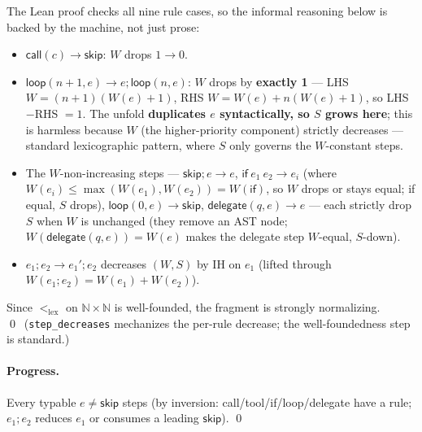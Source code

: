 \documentclass[11pt]{article}
\theoremstyle{plain}
\newcommand{\kw}[1]{\mathsf{#1}}                      %
\begin{document}
The Lean proof checks all nine rule cases, so the informal reasoning below is backed by the
machine, not just prose:
\begin{itemize}
\item $\kw{call}(c) \to \kw{skip}$: $W$ drops $1 \to 0$.
\item $\kw{loop}(n+1, e) \to e ; \kw{loop}(n, e)$: $W$ drops by \textbf{exactly 1} --- LHS
  $W = (n+1)(W(e) + 1)$, RHS $W = W(e) + n (W(e) + 1)$, so LHS$-$RHS $= 1$. The unfold
  \textbf{duplicates $e$ syntactically, so $S$ grows here}; this is harmless because $W$ (the
  higher-priority component) strictly decreases --- standard lexicographic pattern, where $S$ only
  governs the $W$-constant steps.
\item The $W$-non-increasing steps --- $\kw{skip} ; e \to e$, $\kw{if}\ e_1\ e_2 \to e_i$ (where
  $W(e_i) \le \max(W(e_1), W(e_2)) = W(\kw{if})$, so $W$ drops or stays equal; if equal, $S$
  drops), $\kw{loop}(0, e) \to \kw{skip}$, $\kw{delegate}(q, e) \to e$ --- each strictly drop $S$
  when $W$ is unchanged (they remove an AST node; $W(\kw{delegate}(q, e)) = W(e)$ makes the
  delegate step $W$-equal, $S$-down).
\item $e_1 ; e_2 \to e_1' ; e_2$ decreases $(W, S)$ by IH on $e_1$ (lifted through
  $W(e_1 ; e_2) = W(e_1) + W(e_2)$).
\end{itemize}
Since $<_{\mathrm{lex}}$ on $\mathbb{N} \times \mathbb{N}$ is well-founded, the fragment is
strongly normalizing. \qed\ (\texttt{step\_decreases} mechanizes the per-rule decrease; the
well-foundedness step is standard.)

\paragraph{Progress.}
Every typable $e \neq \kw{skip}$ steps (by inversion: call/tool/if/loop/delegate have a rule;
$e_1 ; e_2$ reduces $e_1$ or consumes a leading $\kw{skip}$). \qed
\end{document}

